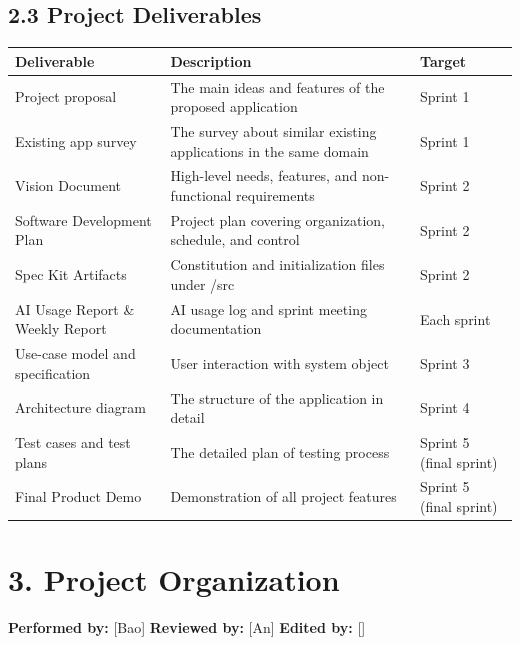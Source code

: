 \documentclass[12pt]{article}
\renewcommand{\baselinestretch}{1.5}
\begin{document}
\subsection*{2.3 Project Deliverables}
\par\medskip
\begingroup
\scriptsize
\renewcommand{\baselinestretch}{1.0}\selectfont
\renewcommand{\arraystretch}{1.15}
\setlength{\tabcolsep}{4pt}
\begin{longtable}{|>{\raggedright\arraybackslash}p{}|>{\raggedright\arraybackslash}p{}|>{\raggedright\arraybackslash}p{}|}
\hline
Deliverable & Description & Target \\ \hline
\endhead
Project proposal & The main ideas and features of the proposed application & Sprint 1 \\ \hline
Existing app survey & The survey about similar existing applications in the same domain & Sprint 1 \\ \hline
Vision Document & High-level needs, features, and non-functional requirements & Sprint 2 \\ \hline
Software Development Plan & Project plan covering organization, schedule, and control & Sprint 2 \\ \hline
Spec Kit Artifacts & Constitution and initialization files under /\allowbreak{}src & Sprint 2 \\ \hline
AI Usage Report \& Weekly Report & AI usage log and sprint meeting documentation & Each sprint \\ \hline
Use-case model and specification & User interaction with system object & Sprint 3 \\ \hline
Architecture diagram & The structure of the application in detail & Sprint 4 \\ \hline
Test cases and test plans & The detailed plan of testing process & Sprint 5 (final sprint) \\ \hline
Final Product Demo & Demonstration of all project features & Sprint 5 (final sprint) \\ \hline
\end{longtable}
\endgroup
\par\medskip
\hypertarget{sec:3-project-organization}{}
\section*{3. Project Organization}
\par\medskip
\textbf{Performed by:} [Bao] \textbar{} \textbf{Reviewed by:} [An] \textbar{} \textbf{Edited by:} []
\par\medskip
\hypertarget{sec:31-organizational-structure}{}
\end{document}
